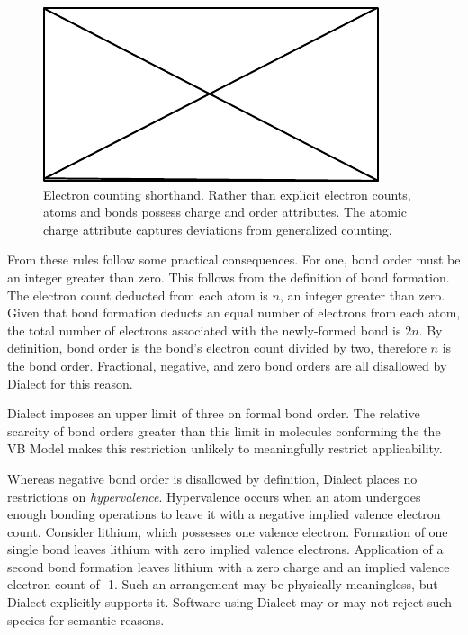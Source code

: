 \documentclass{article}
\begin{document}
\begin{figure}
    \centering
    \includegraphics{filler}
    \caption{Electron counting shorthand. Rather than explicit electron counts, atoms and bonds possess charge and order attributes. The atomic charge attribute captures deviations from generalized counting.}
    \label{fig:electron-counting-shorthand}
\end{figure}

From these rules follow some practical consequences. For one, bond order must be an integer greater than zero. This follows from the definition of bond formation. The electron count deducted from each atom is $n$, an integer greater than zero. Given that bond formation deducts an equal number of electrons from each atom, the total number of electrons associated with the newly-formed bond is $2n$. By definition, bond order is the bond's electron count divided by two, therefore $n$ is the bond order. Fractional, negative, and zero bond orders are all disallowed by Dialect for this reason.

Dialect imposes an upper limit of three on formal bond order. The relative scarcity of bond orders greater than this limit in molecules conforming the the VB Model makes this restriction unlikely to meaningfully restrict applicability.

Whereas negative bond order is disallowed by definition, Dialect places no restrictions on \textit{hypervalence}. Hypervalence occurs when an atom undergoes enough bonding operations to leave it with a negative implied valence electron count. Consider lithium, which possesses one valence electron. Formation of one single bond leaves lithium with zero implied valence electrons. Application of a second bond formation leaves lithium with a zero charge and an implied valence electron count of -1. Such an arrangement may be physically meaningless, but Dialect explicitly supports it. Software using Dialect may or may not reject such species for semantic reasons.
\end{document}
